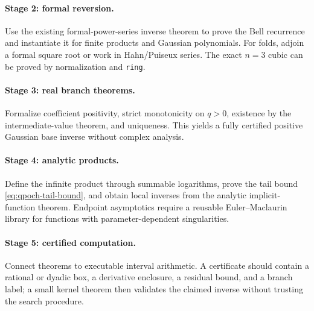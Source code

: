 \documentclass[11pt,letterpaper,oneside,openany]{book}
\theoremstyle{definition}
\theoremstyle{remark}
\begin{document}
\paragraph{Stage 2: formal reversion.}
Use the existing formal-power-series inverse theorem to prove the Bell
recurrence and instantiate it for finite products and Gaussian polynomials.
For folds, adjoin a formal square root or work in Hahn/Puiseux series.  The
exact \(n=3\) cubic can be proved by normalization and \texttt{ring}.

\paragraph{Stage 3: real branch theorems.}
Formalize coefficient positivity, strict monotonicity on \(q>0\), existence by
the intermediate-value theorem, and uniqueness.  This yields a fully certified
positive Gaussian base inverse without complex analysis.

\paragraph{Stage 4: analytic products.}
Define the infinite product through summable logarithms, prove the tail bound
\eqref{eq:qpoch-tail-bound}, and obtain local inverses from the analytic
implicit-function theorem.  Endpoint asymptotics require a reusable
Euler--Maclaurin library for functions with parameter-dependent singularities.

\paragraph{Stage 5: certified computation.}
Connect theorems to executable interval arithmetic.  A certificate should
contain a rational or dyadic box, a derivative enclosure, a residual bound,
and a branch label; a small kernel theorem then validates the claimed inverse
without trusting the search procedure.
\end{document}
